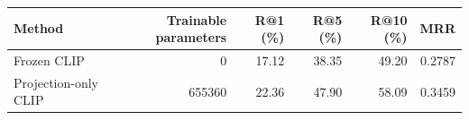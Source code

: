 \begin{tabular}{lrrrrr}
\toprule
Method & Trainable parameters & R@1 (\%) & R@5 (\%) & R@10 (\%) & MRR \\
\midrule
Frozen CLIP & 0 & 17.12 & 38.35 & 49.20 & 0.2787 \\
Projection-only CLIP & 655360 & 22.36 & 47.90 & 58.09 & 0.3459 \\
\bottomrule
\end{tabular}
